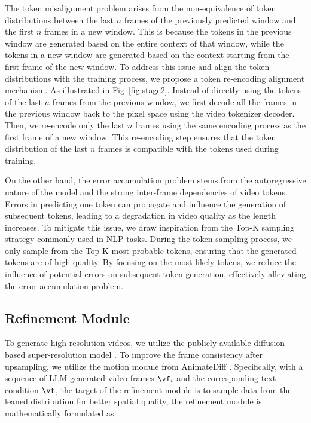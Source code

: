 The token misalignment problem arises from the non-equivalence of token distributions between the last $n$ frames of the previously predicted window and the first $n$ frames in a new window. This is because the tokens in the previous window are generated based on the entire context of that window, while the tokens in a new window are generated based on the context starting from the first frame of the new window. To address this issue and align the token distributions with the training process, we propose a token re-encoding alignment mechanism. As illustrated in Fig~\ref{fig:stage2}. Instead of directly using the tokens of the last $n$ frames from the previous window, we first decode all the frames in the previous window back to the pixel space using the video tokenizer decoder. Then, we re-encode only the last $n$ frames using the same encoding process as the first frame of a new window. This re-encoding step ensures that the token distribution of the last $n$ frames is compatible with the tokens used during training.

On the other hand, the error accumulation problem stems from the autoregressive nature of the model and the strong inter-frame dependencies of video tokens. Errors in predicting one token can propagate and influence the generation of subsequent tokens, leading to a degradation in video quality as the length increases. To mitigate this issue, we draw inspiration from the Top-K sampling strategy commonly used in NLP tasks. During the token sampling process, we only sample from the Top-K most probable tokens, ensuring that the generated tokens are of high quality. By focusing on the most likely tokens, we reduce the influence of potential errors on subsequent token generation, effectively alleviating the error accumulation problem.

\subsection{Refinement Module}
\label{sec:3.4}
To generate high-resolution videos, we utilize the publicly available diffusion-based super-resolution model \cite{stable_diff}. To improve the frame consistency after upsampling, we utilize the motion module from AnimateDiff \cite{guo2023animatediff}. Specifically, with a sequence of LLM generated video frames $\vf_i$ and the corresponding text condition $\vt$, the target of the refinement module is to sample data from the leaned distribution for better spatial quality, the refinement module is mathematically formulated as:


